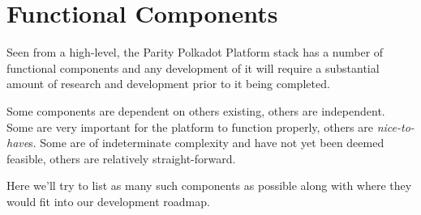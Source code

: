 \section{Functional Components}
\label{functional-components}

 Seen from a high-level, the Parity Polkadot Platform stack has a number of functional components and any development of it will require a substantial amount of research and development prior to it being completed.

 Some components are dependent on others existing, others are independent. Some are very important for the platform to function properly, others are \textit{nice-to-have}s. Some are of indeterminate complexity and have not yet been deemed feasible, others are relatively straight-forward.

 Here we'll try to list as many such components as possible along with where they would fit into our development roadmap.

